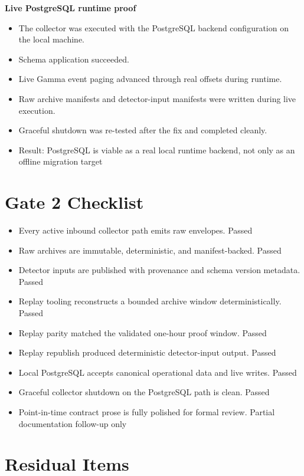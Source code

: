 \documentclass{article}
\begin{document}
\textbf{Live PostgreSQL runtime proof}
\begin{itemize}
\item The collector was executed with the PostgreSQL backend configuration on the local machine.
\item Schema application succeeded.
\item Live Gamma event paging advanced through real offsets during runtime.
\item Raw archive manifests and detector-input manifests were written during live execution.
\item Graceful shutdown was re-tested after the fix and completed cleanly.
\item Result: PostgreSQL is viable as a real local runtime backend, not only as an offline migration target
\end{itemize}

\section*{Gate 2 Checklist}

\begin{itemize}
\item Every active inbound collector path emits raw envelopes. Passed
\item Raw archives are immutable, deterministic, and manifest-backed. Passed
\item Detector inputs are published with provenance and schema version metadata. Passed
\item Replay tooling reconstructs a bounded archive window deterministically. Passed
\item Replay parity matched the validated one-hour proof window. Passed
\item Replay republish produced deterministic detector-input output. Passed
\item Local PostgreSQL accepts canonical operational data and live writes. Passed
\item Graceful collector shutdown on the PostgreSQL path is clean. Passed
\item Point-in-time contract prose is fully polished for formal review. Partial documentation follow-up only
\end{itemize}

\section*{Residual Items}
\end{document}
